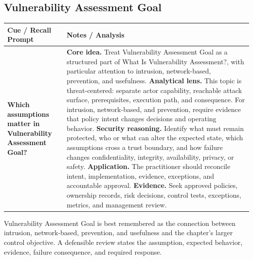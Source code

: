 \documentclass[11pt]{article}
\newcommand{\CornellHeader}{%
\rowcolor{Navy}\color{white}\bfseries Cue / Recall Prompt & \color{white}\bfseries Notes / Analysis\\\hline}
\newcommand{\CornellRow}[2]{%
\cellcolor{CueGray}\RaggedRight\textbf{#1} & \RaggedRight #2\\\hline}
\begin{document}
\subsection*{Vulnerability Assessment Goal}
\begin{longtable}{>{\RaggedRight\arraybackslash}p{}|>{\RaggedRight\arraybackslash}p{}}
\CornellHeader
\CornellRow{Which assumptions matter in Vulnerability Assessment Goal?}{\textbf{Core idea.} Treat Vulnerability Assessment Goal as a structured part of What Is Vulnerability Assessment?, with particular attention to intrusion, network-based, prevention, and usefulness. \textbf{Analytical lens.} This topic is threat-centered: separate actor capability, reachable attack surface, prerequisites, execution path, and consequence. For intrusion, network-based, and prevention, require evidence that policy intent changes decisions and operating behavior. \textbf{Security reasoning.} Identify what must remain protected, who or what can alter the expected state, which assumptions cross a trust boundary, and how failure changes confidentiality, integrity, availability, privacy, or safety. \textbf{Application.} The practitioner should reconcile intent, implementation, evidence, exceptions, and accountable approval. \textbf{Evidence.} Seek approved policies, ownership records, risk decisions, control tests, exceptions, metrics, and management review.}
\end{longtable}
\begin{topicsummary}
Vulnerability Assessment Goal is best remembered as the connection between intrusion, network-based, prevention, and usefulness and the chapter's larger control objective. A defensible review states the assumption, expected behavior, evidence, failure consequence, and required response.
\end{topicsummary}
\end{document}
